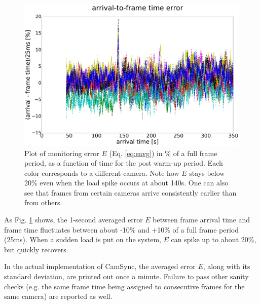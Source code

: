 \begin{figure}[h]
	\centering
	\includegraphics[width=\linewidth]{figures/monitoring.pdf}
        \caption{Plot of monitoring error $E$ (Eq. \ref{eq:eavg}) in
          \% of a full frame period, as a
          function of time for the post warm-up period. Each color
          corresponds to a different camera. Note how $E$ stays below
          20\% even when the load spike occurs at about 140s. One can also
          see that frames from certain cameras arrive consistently
          earlier than from others.}
    \label{fig:monitor}
\end{figure}

As Fig. \ref{fig:monitor} shows, the 1-second averaged error $E$ between
frame arrival time and frame time fluctuates between about -10\% and
+10\% of a full frame period (25ms). When a sudden load is put on the
system, $E$ can spike up to about 20\%, but quickly recovers.

In the actual implementation of CamSync, the averaged error $E$, along
with its standard deviation, are printed out once a minute. Failure to
pass other sanity checks (e.g. the same frame time being assigned to
consecutive frames for the same camera) are reported as well.

